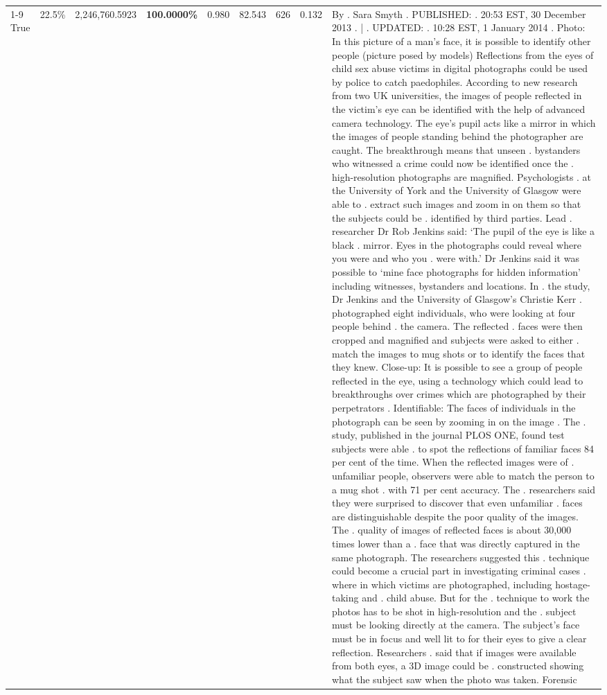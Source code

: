 \begin{table}[H]
\begin{tabular}{lllrlllll}
\cline{1-9} \cline{2-9}
True & 22.5\% & 2,246,760.5923 & \bfseries \color{red} 100.0000\% & 0.980 & 82.543 & 626 & 0.132 & By . Sara Smyth . PUBLISHED: . 20:53 EST, 30 December 2013 . | . UPDATED: . 10:28 EST, 1 January 2014 . Photo: In this picture of a man's face, it is possible to identify other people (picture posed by models) Reflections from the eyes of child sex abuse victims in digital photographs could be used by police to catch paedophiles. According to new research from two UK universities, the images of people reflected in the victim's eye can be identified with the help of advanced camera technology. The eye's pupil acts like a mirror in which the images of people standing behind the photographer are caught. The breakthrough means that unseen . bystanders who witnessed a crime could now be identified once the . high-resolution photographs are magnified. Psychologists . at the University of York and the University of Glasgow were able to . extract such images and zoom in on them so that the subjects could be . identified by third parties. Lead . researcher Dr Rob Jenkins said: ‘The pupil of the eye is like a black . mirror. Eyes in the photographs could reveal where you were and who you . were with.' Dr Jenkins said it was possible to ‘mine face photographs for hidden information' including witnesses, bystanders and locations. In . the study, Dr Jenkins and the University of Glasgow's Christie Kerr . photographed eight individuals, who were looking at four people behind . the camera. The reflected . faces were then cropped and magnified and subjects were asked to either . match the images to mug shots or to identify the faces that they knew. Close-up: It is possible to see a group of people reflected in the eye, using a technology which could lead to breakthroughs over crimes which are photographed by their perpetrators . Identifiable: The faces of individuals in the photograph can be seen by zooming in on the image . The . study, published in the journal PLOS ONE, found test subjects were able . to spot the reflections of familiar faces 84 per cent of the time. When the reflected images were of . unfamiliar people, observers were able to match the person to a mug shot . with 71 per cent accuracy. The . researchers said they were surprised to discover that even unfamiliar . faces are distinguishable despite the poor quality of the images. The . quality of images of reflected faces is about 30,000 times lower than a . face that was directly captured in the same photograph. The researchers suggested this . technique could become a crucial part in investigating criminal cases . where in which victims are photographed, including hostage-taking and . child abuse. But for the . technique to work the photos has to be shot in high-resolution and the . subject must be looking directly at the camera. The subject's face must be in focus and well lit to for their eyes to give a clear reflection. Researchers . said that if images were available from both eyes, a 3D image could be . constructed showing what the subject saw when the photo was taken. Forensic \\

\end{tabular}
\end{table}
